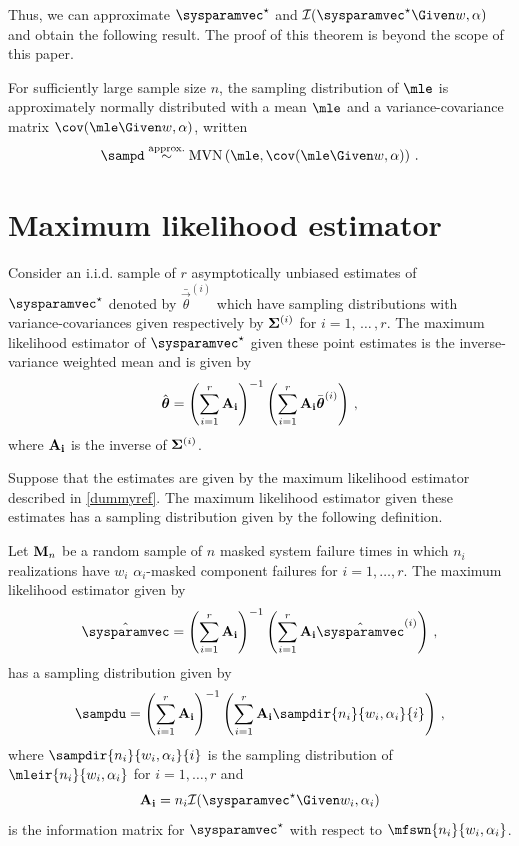 \documentclass[ ../main.tex]{subfiles}
\begin{document}
\fussy
Thus, we can approximate $\tparam\sysparamvec$ and $\infomatrx(\tparam\sysparamvec \Given w, \alpha)$ and obtain the following result. The proof of this theorem is beyond the scope of this paper.
\begin{theorem}
\label{thm:approx_normal}
For sufficiently large sample size $n$, the sampling distribution of $\mle$ is approximately normally distributed with a mean $\mle$ and a variance-covariance matrix $\cov(\mle \Given w, \alpha)$, written
\begin{equation}
\label{eq:asymptotic_normality}
    \sampd \stackrel{\text{approx.}}{\sim} \mvn\left(\mle, \cov(\mle \Given w, \alpha)\right)\,.
\end{equation}
\end{theorem}

\section{Maximum likelihood estimator}
\label{sec:full_samp_dist}
Consider an i.i.d. sample of $r$ asymptotically unbiased estimates of $\tparam\sysparamvec$ denoted by $\bar{\vec\theta}^{(i)}$ which have sampling distributions with variance-covariances given respectively by $\mathbf{\Sigma}^{(i)}$ for $i=1,\,\ldots\,,r$.
The maximum likelihood estimator of $\tparam\sysparamvec$ given these point estimates is the inverse-variance weighted mean and is given by
\begin{equation}
    \hat{\boldsymbol{\theta}} = \left( \sum_{i=1}^{r} \mathbf{A_i} \right)^{-1}
    \left( \sum_{i=1}^{r} \mathbf{A_i} \bar{\boldsymbol{\theta}}^{(i)} \right)\,,
\end{equation}
where $\mathbf{A_i}$ is the inverse of $\mathbf{\Sigma}^{(i)}$.

Suppose that the estimates are given by the maximum likelihood estimator described in \cref{dummyref}.
The maximum likelihood estimator given these estimates has a sampling distribution given by the following definition.
\begin{definition}
Let $\mathbf{M}_n$ be a random sample of $n$ masked system failure times in which $n_i$ realizations have $w_i$ $\alpha_i$-masked component failures for $i = 1,\ldots,r$.
The maximum likelihood estimator given by
\begin{equation}
    \hat{\sysparamvec} = \left( \sum_{i=1}^{r} \matrx{A_i} \right)^{-1}
    \left( \sum_{i=1}^{r} \matrx{A_i} \hat\sysparamvec^{(i)} \right)\,,
\end{equation}
has a sampling distribution given by
\begin{equation}
    \sampdu = \left( \sum_{i=1}^{r} \matrx{A_i} \right)^{-1}
    \left( \sum_{i=1}^{r} \matrx{A_i} \sampdir{n_i}{w_i,\alpha_i}{i}\right)\,,
\end{equation}
where $\sampdir{n_i}{w_i,\alpha_i}{i}$ is the sampling distribution of $\mleir{n_i}{w_i,\alpha_i}$ for $i=1,\ldots,r$ and
\begin{equation}
\label{eq:mat_A_info}
    \matrx{A_i} = n_i \infomatrx(\tparam\sysparamvec \Given w_i, \alpha_i)
\end{equation}
is the information matrix for $\tparam\sysparamvec$ with respect to $\mfswn{n_i}{w_i,\alpha_i}$.
\end{definition}
\end{document}
